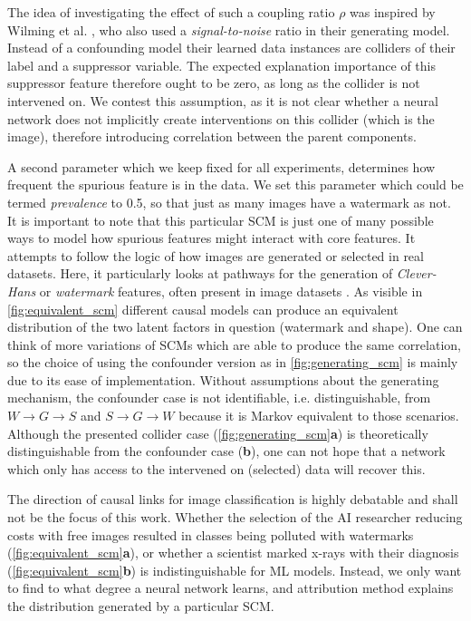 The idea of investigating the effect of such a coupling ratio $\rho$ was inspired by Wilming et al. \cite{Wilming2023}, who also used a \textit{signal-to-noise} ratio in their generating model. Instead of a confounding model their learned data instances are colliders of their label and a suppressor variable. The expected explanation importance of this suppressor feature therefore ought to be zero, as long as the collider is not intervened on. We contest this assumption, as it is not clear whether a neural network does not implicitly create interventions on this collider (which is the image), therefore introducing correlation between the parent components. 

A second parameter which we keep fixed for all experiments, determines how frequent the spurious feature is in the data. We set this parameter which could be termed \textit{prevalence} to 0.5, so that just as many images have a watermark as not. It is important to note that this particular SCM is just one of many possible ways to model how spurious features might interact with core features. It attempts to follow the logic of how images are generated or selected in real datasets. Here, it particularly looks at pathways for the generation of \textit{Clever-Hans} or \textit{watermark} features, often present in image datasets \cite{Lapuschkin2019}. As visible in \cref{fig:equivalent_scm} different causal models can produce an equivalent distribution of the two latent factors in question (watermark and shape). One can think of more variations of SCMs which are able to produce the same correlation, so the choice of using the confounder version as in \cref{fig:generating_scm} is mainly due to its ease of implementation. Without assumptions about the generating mechanism, the confounder case is not identifiable, i.e. distinguishable, from $W \rightarrow G \rightarrow S$ and $S \rightarrow G \rightarrow W$ because it is Markov equivalent to those scenarios. 
Although the presented collider case (\cref{fig:generating_scm}\textbf{a}) is theoretically distinguishable from the confounder case (\textbf{b}), one can not hope that a network which only has access to the intervened on (selected) data will recover this. 

The direction of causal links for image classification is highly debatable and shall not be the focus of this work. Whether the selection of the AI researcher reducing costs with free images resulted in classes being polluted with watermarks (\cref{fig:equivalent_scm}\textbf{a}), or whether a scientist marked x-rays with their diagnosis (\cref{fig:equivalent_scm}\textbf{b}) is indistinguishable for ML models. 
Instead, we only want to find to what degree a neural network learns, and attribution method explains the distribution generated by a particular SCM.

